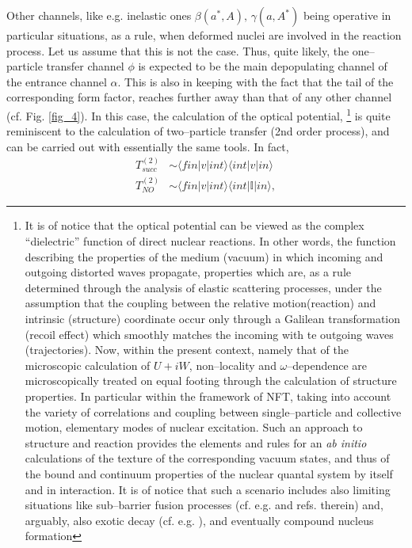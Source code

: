 \documentclass[a4paper,11pt]{book}
\numberwithin{equation}{section}
\numberwithin{figure}{section}
\numberwithin{table}{section}
\begin{document}
\begin{subappendices}
Other channels, like e.g. inelastic ones $\beta(a^*,A),\,\gamma(a,A^*)$ being operative in particular situations, as a rule, when deformed nuclei are involved in the reaction process. Let us assume that this is not the case. Thus, quite likely, the one--particle transfer channel $\phi$ is expected to be the main depopulating channel of the entrance channel $\alpha$. This is also in keeping with the fact that the tail of the corresponding form factor, reaches further away than that of any other channel (cf. Fig. \ref{fig_4}). In this case, the calculation of the optical potential, \footnote{It is of notice that the optical potential can be viewed as the complex ``dielectric'' function of direct nuclear reactions. In other words, the function describing the properties of the medium (vacuum) in which incoming and outgoing distorted waves propagate, properties which are, as a rule determined through the analysis of elastic scattering processes, under the assumption that the coupling between the relative motion(reaction) and intrinsic (structure) coordinate occur only  through a Galilean transformation (recoil effect) which smoothly matches the incoming with te outgoing waves (trajectories). Now, within the present context, namely that of the microscopic calculation of $U+iW$, non--locality and $\omega$--dependence are microscopically treated on equal footing through the calculation of structure properties. In particular within the framework of NFT, taking into account the variety of correlations and coupling between single--particle and collective motion, elementary modes of nuclear excitation. Such an approach to structure and reaction provides the elements and rules for  an \emph{ab initio} calculations of the texture of the corresponding vacuum states, and thus of the bound and continuum properties of the nuclear quantal system by itself and in interaction. It is of notice that such a scenario includes also limiting situations like sub--barrier fusion processes (cf. e.g. \cite{Sargsyan:13} and refs. therein) and, arguably, also exotic decay (cf. e.g. \cite{Barranco:88,Barranco:90}), and eventually compound nucleus formation} is quite reminiscent to the calculation of two--particle transfer (2nd order process), and can be carried out with essentially the same tools. In fact, 
\begin{equation}
\begin{split}
T^{(2)}_{succ}&\sim \langle fin|v|int\rangle\langle int |v|in\rangle\\
T^{(2)}_{NO}&\sim \langle fin|v|int\rangle\langle int |\mathbb{I}|in\rangle,

\end{split}
\end{equation}
\end{subappendices}
\end{document}
